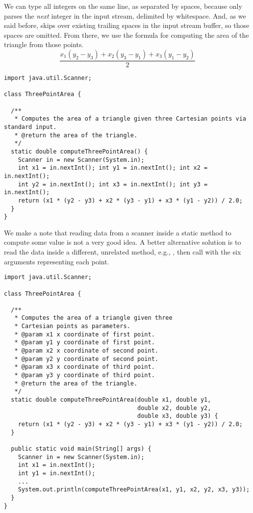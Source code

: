 We can type all integers on the same line, as separated by spaces, because  only parses the \emph{next} integer in the input stream, delimited by whitespace. 
And, as we said before,  skips over existing trailing spaces in the input stream buffer, so those spaces are omitted. 
From there, we use the formula for computing the area of the triangle from those points.
\[
\dfrac{x_1(y_2 - y_3) + x_2(y_3 - y_1) + x_3 (y_1 - y_2)}{2}
\]
\begin{lstlisting}[language=MyJava]
import java.util.Scanner;

class ThreePointArea {

  /**
   * Computes the area of a triangle given three Cartesian points via standard input.
   * @return the area of the triangle.
   */
  static double computeThreePointArea() {
    Scanner in = new Scanner(System.in);
    int x1 = in.nextInt(); int y1 = in.nextInt(); int x2 = in.nextInt(); 
    int y2 = in.nextInt(); int x3 = in.nextInt(); int y3 = in.nextInt();
    return (x1 * (y2 - y3) + x2 * (y3 - y1) + x3 * (y1 - y2)) / 2.0;
  }
}
\end{lstlisting}

We make a note that reading data from a scanner inside a static method to compute some value is not a very good idea. 
A better alternative solution is to read the data inside a different, unrelated method, e.g., , then call  with the six arguments representing each point.

\begin{lstlisting}[language=MyJava]
import java.util.Scanner;

class ThreePointArea {
  
  /**
   * Computes the area of a triangle given three 
   * Cartesian points as parameters.
   * @param x1 x coordinate of first point.
   * @param y1 y coordinate of first point.
   * @param x2 x coordinate of second point.
   * @param y2 y coordinate of second point.
   * @param x3 x coordinate of third point.
   * @param y3 y coordinate of third point.
   * @return the area of the triangle.
   */
  static double computeThreePointArea(double x1, double y1,
                                      double x2, double y2,
                                      double x3, double y3) {
    return (x1 * (y2 - y3) + x2 * (y3 - y1) + x3 * (y1 - y2)) / 2.0;
  }

  public static void main(String[] args) {
    Scanner in = new Scanner(System.in);
    int x1 = in.nextInt();
    int y1 = in.nextInt();
    ...
    System.out.println(computeThreePointArea(x1, y1, x2, y2, x3, y3));
  }
}
\end{lstlisting}


